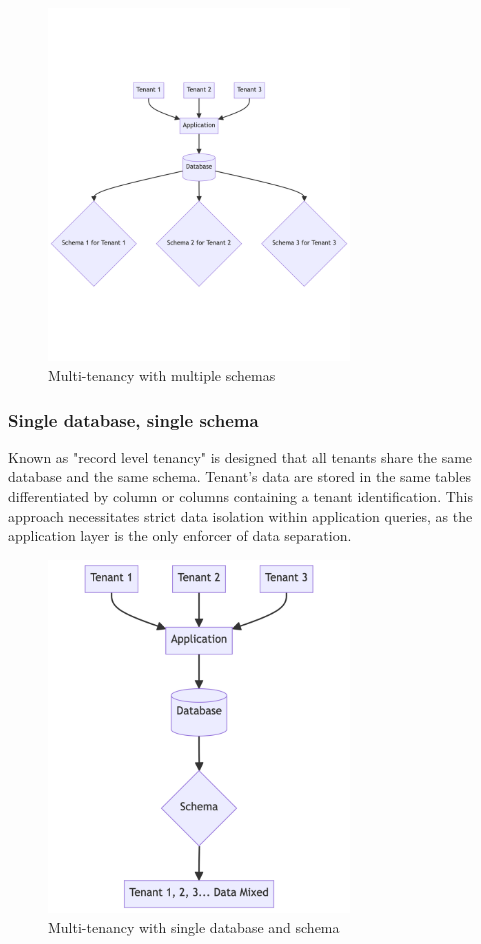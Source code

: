 \begin{figure}[p]\centering
\includegraphics[width=80mm]{img/chap04/fig_multitenancy_multiple_schemas.png}
\caption{Multi-tenancy with multiple schemas}
\label{img04:multitenancy-multiple-schemas}
\end{figure}


\subsubsection{Single database, single schema}
\label{subsubsec:single-database-single-schema}
Known as "record level tenancy" is designed that all tenants share the same database and the same schema.
Tenant's data are stored in the same tables differentiated by column or columns containing a tenant identification.
This approach necessitates strict data isolation within application queries, as the application layer is the only enforcer of data separation.

\begin{figure}[p]\centering
\includegraphics[width=80mm]{img/chap04/fig_multitenancy_single_database_single_schema.png}
\caption{Multi-tenancy with single database and schema}
\label{img04:multitenancy-single-database-single-schema}
\end{figure}


